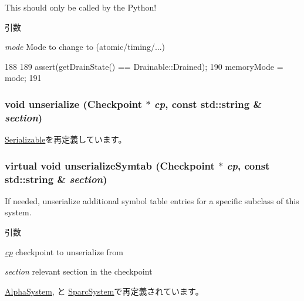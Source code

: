 This should only be called by the Python!


\begin{DoxyParams}{引数}
\item[{\em mode}]Mode to change to (atomic/timing/...) \end{DoxyParams}



\begin{DoxyCode}
188 {
189     assert(getDrainState() == Drainable::Drained);
190     memoryMode = mode;
191 }
\end{DoxyCode}
\hypertarget{classSystem_af22e5d6d660b97db37003ac61ac4ee49}{
\subsubsection[{unserialize}]{\setlength{\rightskip}{0pt plus 5cm}void unserialize ({\bf Checkpoint} $\ast$ {\em cp}, \/  const std::string \& {\em section})}}
\label{classSystem_af22e5d6d660b97db37003ac61ac4ee49}


\hyperlink{classSerializable_af100c4e9feabf3cd918619c88c718387}{Serializable}を再定義しています。\hypertarget{classSystem_a3536a2e47acf307ec65515712f0e2b2d}{
\subsubsection[{unserializeSymtab}]{\setlength{\rightskip}{0pt plus 5cm}virtual void unserializeSymtab ({\bf Checkpoint} $\ast$ {\em cp}, \/  const std::string \& {\em section})}}
\label{classSystem_a3536a2e47acf307ec65515712f0e2b2d}
If needed, unserialize additional symbol table entries for a specific subclass of this system.


\begin{DoxyParams}{引数}
\item[{\em \hyperlink{namespacecp}{cp}}]checkpoint to unserialize from \item[{\em section}]relevant section in the checkpoint \end{DoxyParams}


\hyperlink{classAlphaSystem_a183b92b9eac0994f5d446702e995132a}{AlphaSystem}, と \hyperlink{classSparcSystem_a183b92b9eac0994f5d446702e995132a}{SparcSystem}で再定義されています。



